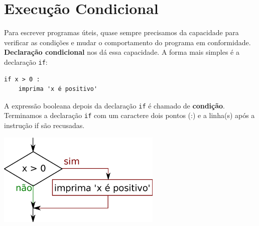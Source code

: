 
\section{Execução Condicional}
\label{execução condicional}


Para escrever programas úteis, quase sempre precisamos da capacidade
para verificar as condições e mudar o comportamento do programa
em conformidade.  {\bf Declaração condicional} nos dá essa capacidade.  A
forma mais simples é a declaração {\tt if}:


\beforeverb
\begin{verbatim}
if x > 0 :
    imprima 'x é positivo'
\end{verbatim}
\afterverb
%

A expressão booleana depois da declaração {\tt if} é
chamado de {\bf condição}. Terminamos a declaração {\tt if}
com um caractere dois pontos (:) e a linha(s)
após a instrução if são recusadas.


\beforefig
\centerline{\includegraphics[height=1.75in]{figs2/if.eps}}
\afterfig

